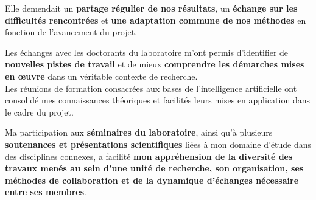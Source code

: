 \documentclass[12pt,a4paper,oneside]{report}
\begin{document}
\hspace*{0.5cm}Elle demendait un \textbf{partage régulier de nos résultats}, un \textbf{échange sur les difficultés rencontrées} et \textbf{une adaptation commune de nos méthodes} en fonction de l'avancement du projet.\vspace{0.1cm}

\hspace*{1cm}Les échanges avec les doctorants du laboratoire m'ont permis d'identifier de \textbf{nouvelles pistes de travail} et de mieux \textbf{comprendre les démarches mises en œuvre} dans un véritable contexte de recherche. \\
Les réunions de formation consacrées aux bases de l'intelligence artificielle ont consolidé mes connaissances théoriques et facilités leurs mises en application dans le cadre du projet.\vspace{0.1cm}

\hspace*{1cm}Ma participation aux \textbf{séminaires du laboratoire}, ainsi qu'à plusieurs \textbf{soutenances et présentations scientifiques} liées à mon domaine d'étude dans des disciplines connexes, a facilité \textbf{mon appréhension de la diversité des travaux menés au sein d'une unité de recherche, son organisation, ses méthodes de collaboration et de la dynamique d'échanges nécessaire entre ses membres}.
\end{document}
